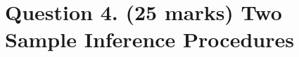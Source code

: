 \documentclass[a4paper,12pt]{article}
\begin{document}
\section*{Question 4. (25 marks) Two Sample Inference Procedures }

%
%	
%
%
%		
%
%	
%	
\end{document}
